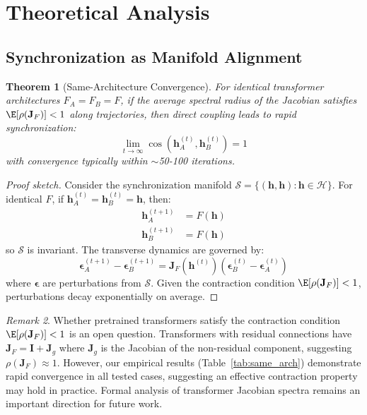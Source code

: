 \documentclass[10pt]{article} %
\theoremstyle{plain}
\newtheorem{theorem}{Theorem}[section]
\theoremstyle{definition}
\theoremstyle{remark}
\newtheorem{remark}[theorem]{Remark}
\newcommand{\cH}{\mathcal{H}}
\newcommand{\cS}{\mathcal{S}}
\newcommand{\vect}[1]{\bm{#1}}
\newcommand{\mat}[1]{\mathbf{#1}}
\begin{document}
\section{Theoretical Analysis}

\subsection{Synchronization as Manifold Alignment}

\begin{theorem}[Same-Architecture Convergence]
\label{thm:convergence}
For identical transformer architectures $F_A = F_B = F$, if the average spectral radius of the Jacobian satisfies $\E[\rho(\mat{J}_F)] < 1$ along trajectories, then direct coupling leads to rapid synchronization:
\begin{equation}
    \lim_{t \to \infty} \cos(\vect{h}_A^{(t)}, \vect{h}_B^{(t)}) = 1
\end{equation}
with convergence typically within $\sim$50-100 iterations.
\end{theorem}

\begin{proof}[Proof sketch]
Consider the synchronization manifold $\cS = \{(\vect{h}, \vect{h}) : \vect{h} \in \cH\}$. For identical $F$, if $\vect{h}_A^{(t)} = \vect{h}_B^{(t)} = \vect{h}$, then:
\begin{align}
    \vect{h}_A^{(t+1)} &= F(\vect{h}) \\
    \vect{h}_B^{(t+1)} &= F(\vect{h})
\end{align}
so $\cS$ is invariant. The transverse dynamics are governed by:
\begin{equation}
    \vect{\epsilon}_A^{(t+1)} - \vect{\epsilon}_B^{(t+1)} = \mat{J}_F(\vect{h}^{(t)}) (\vect{\epsilon}_B^{(t)} - \vect{\epsilon}_A^{(t)})
\end{equation}
where $\vect{\epsilon}$ are perturbations from $\cS$. Given the contraction condition $\E[\rho(\mat{J}_F)] < 1$, perturbations decay exponentially on average.
\end{proof}

\begin{remark}
Whether pretrained transformers satisfy the contraction condition $\E[\rho(\mat{J}_F)] < 1$ is an open question. Transformers with residual connections have $\mat{J}_F = \mat{I} + \mat{J}_g$ where $\mat{J}_g$ is the Jacobian of the non-residual component, suggesting $\rho(\mat{J}_F) \approx 1$. However, our empirical results (Table~\ref{tab:same_arch}) demonstrate rapid convergence in all tested cases, suggesting an effective contraction property may hold in practice. Formal analysis of transformer Jacobian spectra remains an important direction for future work.
\end{remark}
\end{document}
